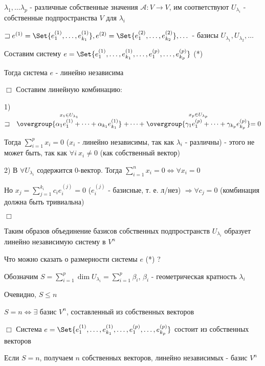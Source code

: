 \documentclass[12pt]{article}
\begin{document}
    \Th $\lambda_1, \dots \lambda_p$ - различные собственные значения $\mathcal{A} : V \rightarrow V$,
    им соответствуют $U_{\lambda_i}$ - собственные подпространства $V$ для $\lambda_i$

    $\sqsupset e^{(1)} = \Set{e^{(1)}_1, \dots, e^{(1)}_{k_1}}, e^{(2)} = \Set{e^{(2)}_1, \dots, e^{(2)}_{k_2}}, \dots$ -
    базисы $U_{\lambda_1}, U_{\lambda_2}, \dots$

    Составим систему $e = \Set{e^{(1)}_1, \dots, e^{(1)}_{k_1}, \dots, e^{(p)}_1, \dots, e^{(p)}_{k_p}}$ (*)

    Тогда система $e$ - линейно независима

    $\Box$ Составим линейную комбинацию:

    1) $\sqsupset \quad \stackrel{x_1 \in U_{\lambda_1}}{\overgroup{\alpha_1 e^{(1)}_1 + \dots + \alpha_{k_1} e^{(1)}_{k_1}}} + \dots +
    \stackrel{x_p \in U_{\lambda_p}}{\overgroup{\gamma_1 e^{(p)}_1 + \dots + \gamma_{k_p} e^{(p)}_{k_p}}} = 0$

    Тогда $\sum_{i=1}^p x_i = 0$ ($x_i$ - линейно независимы, так как $\lambda_i$ - различны) - этого не может быть, так как $\forall i \ x_i \neq 0$ (как собственный вектор)

    2) В $\forall U_{\lambda_i}$ содержится $0$-вектор. Тогда $\sum_{i=1}^n x_i = 0 \Longleftrightarrow \forall x_i = 0$

    Но $x_j = \sum_{j=1}^{k_i} c_i e^{(j)}_i = 0$ ($e^{(j)}_i$ - базисные, т. е. л/нез) $\Longrightarrow \forall c_j = 0$ (комбинация должна быть тривиальна)

    $\Box$

    \Nota Таким образов объединение базисов собственных подпространств $U_{\lambda_i}$ образует линейно независимую систему в $V^n$

    Что можно сказать о размерности системы $e$ (*) ?

    Обозначим $S = \sum_{i=1}^p \dim U_{\lambda_i} = \sum_{i=1}^p \beta_i$, $\beta_i$ - геометрическая кратность $\lambda_i$

    Очевидно, $S \leq n$

    \Th $S = n \Longleftrightarrow \exists$ базис $V^n$, составленный из собственных векторов

    $\Box$ Система $e = \Set{e^{(1)}_1, \dots, e^{(1)}_{k_1}, \dots, e^{(p)}_1, \dots, e^{(p)}_{k_p}}$ состоит из собственных векторов

    Если $S = n$, получаем $n$ собственных векторов, линейно независимых - базис $V^n$
\end{document}
